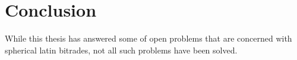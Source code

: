 \chapter*{Conclusion}

While this thesis has answered some of open problems that are concerned with spherical latin bitrades, not all such problems have been solved.